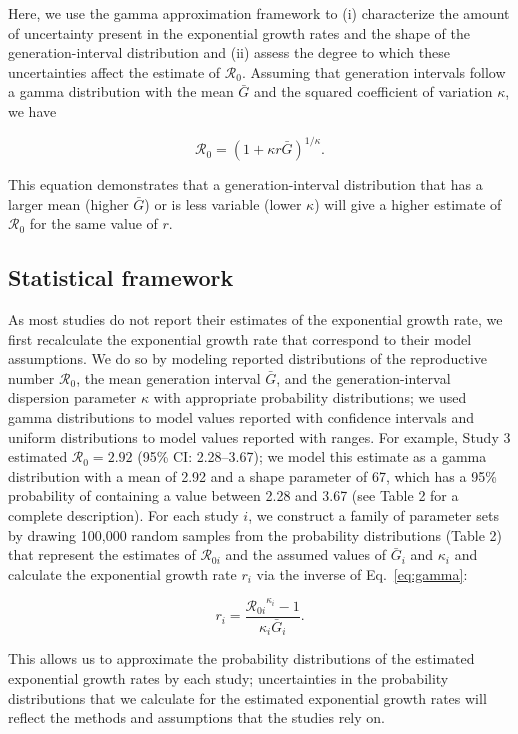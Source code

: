 \documentclass[12pt]{article}
\newcommand{\eref}[1]{Eq.~\ref{eq:#1}}
\newcommand{\Rx}[1]{\ensuremath{{\mathcal R}_{#1}}\xspace}
\newcommand{\Ro}{\ensuremath{{\mathcal R}_{0}}\xspace}
\begin{document}
Here, we use the gamma approximation framework \cite{park2019practical} to (i) characterize the amount of uncertainty present in the exponential growth rates and the shape of the generation-interval distribution and (ii) assess the degree to which these uncertainties affect the estimate of \Ro.
Assuming that generation intervals follow a gamma distribution
with the mean $\bar G$ and the squared coefficient of variation $\kappa$, 
we have
\begin{linenomath*}
\begin{equation}
\Ro = \left(1 + \kappa r \bar{G}\right)^{1/\kappa}.
\label{eq:gamma}
\end{equation}
\end{linenomath*}
This equation demonstrates that a generation-interval distribution
that has a larger mean (higher $\bar{G}$) or is less variable (lower $\kappa$)
will give a higher estimate of \Ro for the same value of $r$.

\subsection{Statistical framework}

As most studies do not report their estimates of the exponential growth rate, we first recalculate the exponential growth rate that correspond to their model assumptions.
We do so by modeling reported distributions of the reproductive number \Ro, the mean generation interval $\bar G$, and the generation-interval dispersion parameter $\kappa$ with appropriate probability distributions;
we used gamma distributions to model values reported with confidence intervals and uniform distributions to model values reported with ranges.
For example, Study 3 estimated $\Ro = 2.92$ (95\% CI: 2.28--3.67);
we model this estimate as a gamma distribution with a mean of 2.92 and a shape parameter of 67, which has a 95\% probability of containing a value between 2.28 and 3.67 (see Table 2 for a complete description).
For each study $i$, we construct a family of parameter sets by drawing 100,000 random samples from the probability distributions (Table 2) that represent the estimates of \Rx{0i} and the assumed values of $\bar G_i$ and $\kappa_i$ and calculate the exponential growth rate $r_i$ via the inverse of \eref{gamma}:
\begin{linenomath*}
\begin{equation}
r_i = \frac{\Rx{0i}^{\kappa_i} - 1}{\kappa_i \bar{G}_i}.
\end{equation}
\end{linenomath*}
This allows us to approximate the probability distributions of the estimated exponential growth rates by each study;
uncertainties in the probability distributions that we calculate for the estimated exponential growth rates will reflect the methods and assumptions that the studies rely on.
\end{document}
